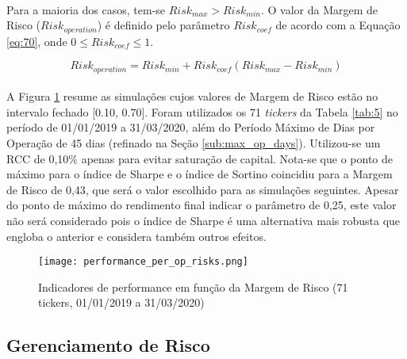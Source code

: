 \paragraph{} Para a maioria dos casos, tem-se \begin{math} Risk_{max} > Risk_{min} \end{math}. O valor da Margem de Risco (\begin{math} Risk_{operation} \end{math}) é definido pelo parâmetro \begin{math} Risk_{coef} \end{math} de acordo com a Equação \ref{eq:70}, onde \begin{math} 0 \le Risk_{coef} \le 1 \end{math}.

\begin{equation} \label{eq:70}
    Risk_{operation} = Risk_{min} + Risk_{coef}(Risk_{max} - Risk_{min})
\end{equation}

\paragraph{} A Figura \ref{fig:553} resume as simulações cujos valores de Margem de Risco estão no intervalo fechado [0.10, 0.70]. Foram utilizados os 71 \textit{tickers} da Tabela \ref{tab:5} no período de 01/01/2019 a 31/03/2020, além do Período Máximo de Dias por Operação de 45 dias (refinado na Seção \ref{sub:max_op_days}). Utilizou-se um RCC de 0,10\% apenas para evitar saturação de capital. Nota-se que o ponto de máximo para o índice de Sharpe e o índice de Sortino coincidiu para a Margem de Risco de 0,43, que será o valor escolhido para as simulações seguintes. Apesar do ponto de máximo do rendimento final indicar o parâmetro de 0,25, este valor não será considerado pois o índice de Sharpe é uma alternativa mais robusta que engloba o anterior e considera também outros efeitos.

\begin{figure}[!htb]
    \texttt{[image: performance\_per\_op\_risks.png]}
    \centering
    \caption{Indicadores de performance em função da Margem de Risco (71 tickers, 01/01/2019 a 31/03/2020)}
    \label{fig:553}
\end{figure}



\FloatBarrier
\subsection{Gerenciamento de Risco}
\label{sub:risk_man}

